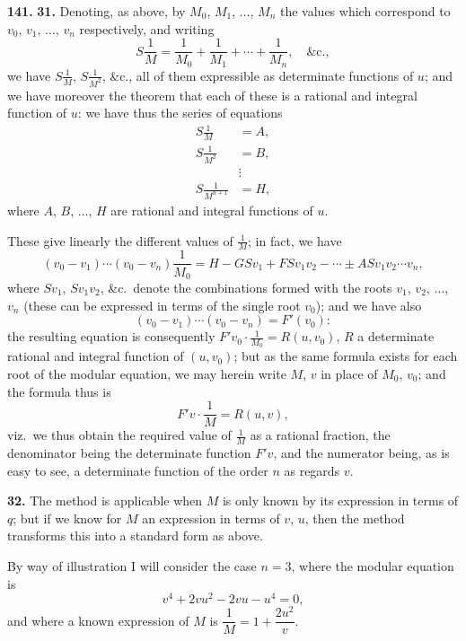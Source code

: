 \documentclass[11pt,a4paper]{book}
\begin{document}
\newpage
\noindent\textbf{141.} \textbf{31.} Denoting, as above, by $M_0$, $M_1$, $\ldots$, $M_n$ the values which correspond to $v_0$, $v_1$, $\ldots$, $v_n$ respectively, and writing
\[
S\frac{1}{M} = \frac{1}{M_0} + \frac{1}{M_1} + \cdots + \frac{1}{M_n}, \quad \&\text{c.},
\]
we have $S\frac{1}{M}$, $S\frac{1}{M^2}$, \&c., all of them expressible as determinate functions of $u$; and we have moreover the theorem that each of these is a rational and integral function of $u$: we have thus the series of equations
\begin{align*}
S\frac{1}{M} &= A, \\
S\frac{1}{M^2} &= B, \\
&\vdots \\
S\frac{1}{M^{n+1}} &= H,
\end{align*}
where $A$, $B$, $\ldots$, $H$ are rational and integral functions of $u$.

These give linearly the different values of $\frac{1}{M}$; in fact, we have
\[
(v_0 - v_1)\cdots(v_0 - v_n)\frac{1}{M_0} = H - GSv_1 + FSv_1v_2 - \cdots \pm ASv_1v_2\cdots v_n,
\]
where $Sv_1$, $Sv_1v_2$, \&c.\ denote the combinations formed with the roots $v_1$, $v_2$, $\ldots$, $v_n$ (these can be expressed in terms of the single root $v_0$); and we have also
\[
(v_0 - v_1)\cdots(v_0 - v_n) = F'(v_0):
\]
the resulting equation is consequently $F'v_0 \cdot \frac{1}{M_0} = R(u, v_0)$, $R$ a determinate rational and integral function of $(u, v_0)$; but as the same formula exists for each root of the modular equation, we may herein write $M$, $v$ in place of $M_0$, $v_0$; and the formula thus is
\[
F'v \cdot \frac{1}{M} = R(u, v),
\]
viz.\ we thus obtain the required value of $\frac{1}{M}$ as a rational fraction, the denominator being the determinate function $F'v$, and the numerator being, as is easy to see, a determinate function of the order $n$ as regards $v$.

\medskip
\noindent\textbf{32.} The method is applicable when $M$ is only known by its expression in terms of $q$; but if we know for $M$ an expression in terms of $v$, $u$, then the method transforms this into a standard form as above.

By way of illustration I will consider the case $n = 3$, where the modular equation is
\[
v^4 + 2vu^2 - 2vu - u^4 = 0,
\]
and where a known expression of $M$ is $\dfrac{1}{M} = 1 + \dfrac{2u^2}{v}$.
\end{document}
